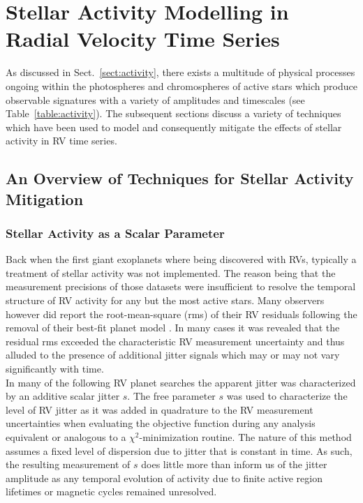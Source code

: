 \chapter{Stellar Activity Modelling in Radial Velocity Time Series}
As discussed in Sect.~\ref{sect:activity}, there exists a multitude of physical
processes ongoing within the photospheres and chromospheres of active stars
which produce observable signatures with a variety of amplitudes and timescales
(see Table~\ref{table:activity}). The subsequent sections discuss a variety of
techniques which have been used to model and consequently mitigate the effects of
stellar activity in RV time series.

\section{An Overview of Techniques for Stellar Activity Mitigation}
\label{sect:methods}

\subsection{Stellar Activity as a Scalar Parameter}
Back when the first giant exoplanets where being discovered with RVs,
typically a treatment of stellar activity was not implemented. The reason being
that the measurement precisions of those datasets were insufficient to resolve the
temporal structure of RV activity for any but the most active stars. Many
observers however did report the root-mean-square (rms) of their RV residuals
following the removal of their best-fit planet model
\citep[e.g.][]{mayor95,butler96}. In
many cases it was revealed that the residual rms exceeded the characteristic RV
measurement uncertainty and thus alluded to the presence of additional
jitter signals which may or may not vary significantly with time. \\

In many of the following RV planet searches the apparent jitter was characterized
by an additive scalar jitter $s$. The free parameter $s$ was used to characterize the
level of RV jitter as it was added in quadrature to the RV measurement
uncertainties when evaluating the objective function during any analysis
equivalent or analogous to a $\chi^2$-minimization routine. The nature of this
method assumes a fixed level of dispersion due to jitter that is constant in time.
As such, the resulting
measurement of $s$ does little more than inform us of the jitter amplitude as
any temporal evolution of activity due to finite active region lifetimes or magnetic
cycles remained unresolved.


